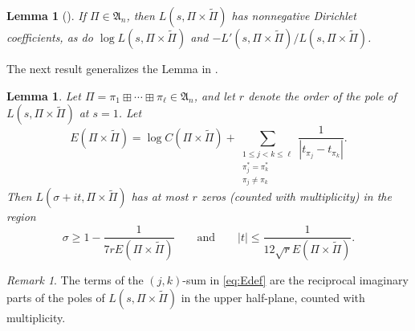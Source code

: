 \documentclass[12pt]{amsart}
\newtheorem{lemma}[theorem]{Lemma}
\theoremstyle{definition}
\theoremstyle{remark}
\newtheorem{remark}[theorem]{Remark}
\numberwithin{equation}{section}
\theoremstyle{plain}
\renewcommand{\tilde}{\widetilde}
\begin{document}
\begin{lemma}[{\cite[Lemma~a]{HoffsteinRamakrishnan}}]
\label{lem:nonneg}
If $\Pi\in\mathfrak{A}_n$, then $L(s,\Pi\times\tilde{\Pi})$ has nonnegative Dirichlet coefficients, as do $\log L(s,\Pi\times\tilde{\Pi})$ and $-L'(s,\Pi\times\tilde{\Pi})/L(s,\Pi\times\tilde{\Pi})$.
\end{lemma}

The next result generalizes the Lemma in \cite[Appendix]{HoffsteinLockhart}.

\begin{lemma}
\label{lem:GHLnew}
Let $\Pi=\pi_1\boxplus\dotsb\boxplus \pi_\ell\in\mathfrak{A}_n$, and let $r$ denote the order of the pole of $L(s,\Pi\times\tilde{\Pi})$ at $s=1$. Let
\begin{equation}
\label{eq:Edef}
E(\Pi\times\tilde{\Pi})=\log C(\Pi\times\tilde{\Pi})+\sum_{\substack{1\leq j<k\leq\ell\\\pi_j^*=\pi_k^*\\\pi_j\neq\pi_k}}\frac{1}{|t_{\pi_j}-t_{\pi_k}|}.
\end{equation}
Then $L(\sigma+it,\Pi\times\tilde{\Pi})$ has at most $r$ zeros (counted with multiplicity) in the region
\[
\sigma\geq 1-\frac{1}{7rE(\Pi\times\tilde{\Pi})}
\qquad\text{and}\qquad
|t|\leq\frac{1}{12\sqrt{r}E(\Pi\times\tilde{\Pi})}.
\]
\end{lemma}

\begin{remark}
\label{rem:E}
The terms of the $(j,k)$-sum in \eqref{eq:Edef} are the reciprocal imaginary parts of the poles of $L(s,\Pi\times\tilde\Pi)$ in the upper half-plane, counted with multiplicity.
\end{remark}
\end{document}

